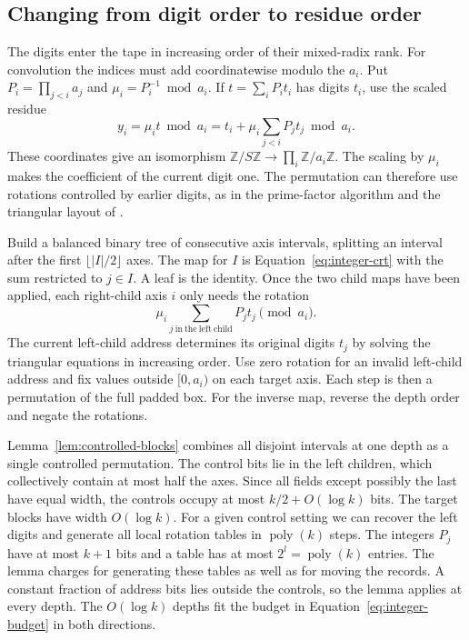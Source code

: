 \subsection{Changing from digit order to residue order}

The digits enter the tape in increasing order of their mixed-radix
rank. For convolution the indices must add coordinatewise modulo the
\(a_i\). Put \(P_i=\prod_{j<i}a_j\) and
\(\mu_i=P_i^{-1}\bmod a_i\). If \(t=\sum_iP_it_i\) has digits
\(t_i\), use the scaled residue
\begin{equation}\label{eq:integer-crt}
 y_i=\mu_i t\bmod a_i
     =t_i+\mu_i\sum_{j<i}P_jt_j\bmod a_i .
\end{equation}
These coordinates give an isomorphism
\(\mathbb Z/S\mathbb Z\to\prod_i\mathbb Z/a_i\mathbb Z\).
The scaling by \(\mu_i\) makes the coefficient of the current digit
one. The permutation can therefore use rotations controlled by
earlier digits, as in the prime-factor algorithm \cite{good} and the
triangular layout of \cite[Equation~(42)]{Tape}.

Build a balanced binary tree of consecutive axis intervals, splitting
an interval after the first \(\lfloor |I|/2\rfloor\) axes. The map for
\(I\) is Equation~\eqref{eq:integer-crt} with the sum restricted to
\(j\in I\). A leaf is the identity. Once the two child maps have been
applied, each right-child axis \(i\) only needs the rotation
\[
       \mu_i\sum_{j\ \mathrm{in\ the\ left\ child}} P_jt_j
       \pmod {a_i}.
\]
The current left-child address determines its original digits \(t_j\)
by solving the triangular equations in increasing order. Use zero
rotation for an invalid left-child address and fix values outside
\([0,a_i)\) on each target axis. Each step is then a permutation of
the full padded box. For the inverse map, reverse the depth order
and negate the rotations.

Lemma~\ref{lem:controlled-blocks} combines all disjoint intervals at
one depth as a single controlled permutation. The control
bits lie in the left children, which collectively contain at most
half the axes. Since all fields except possibly the last have equal
width, the controls occupy at most \(k/2+O(\log k)\) bits. The target
blocks have width \(O(\log k)\). For a given control setting we can
recover the left digits and generate all local rotation tables in
\(\operatorname{poly}(k)\) steps. The integers \(P_j\) have at most
\(k+1\) bits and a table has at most \(2^l=\operatorname{poly}(k)\)
entries. The lemma charges for generating these tables as well as for
moving the records. A constant fraction of address bits lies outside
the controls, so the lemma applies at every depth. The \(O(\log k)\)
depths fit the budget in Equation~\eqref{eq:integer-budget} in both
directions.

